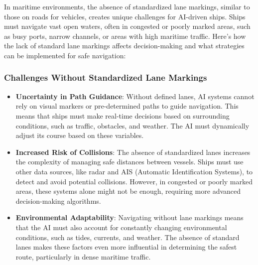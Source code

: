 \documentclass{article}
\begin{document}
In maritime environments, the absence of standardized lane markings, similar to those on roads for vehicles, creates unique challenges for AI-driven ships. Ships must navigate vast open waters, often in congested or poorly marked areas, such as busy ports, narrow channels, or areas with high maritime traffic. Here's how the lack of standard lane markings affects decision-making and what strategies can be implemented for safe navigation:

\subsubsection{\large Challenges Without Standardized Lane Markings}
\begin{itemize}
    \item \textbf{Uncertainty in Path Guidance}: Without defined lanes, AI systems cannot rely on visual markers or pre-determined paths to guide navigation. This means that ships must make real-time decisions based on surrounding conditions, such as traffic, obstacles, and weather. The AI must dynamically adjust its course based on these variables.
    \item \textbf{Increased Risk of Collisions}: The absence of standardized lanes increases the complexity of managing safe distances between vessels. Ships must use other data sources, like radar and AIS (Automatic Identification Systems), to detect and avoid potential collisions. However, in congested or poorly marked areas, these systems alone might not be enough, requiring more advanced decision-making algorithms.
    \item \textbf{Environmental Adaptability}: Navigating without lane markings means that the AI must also account for constantly changing environmental conditions, such as tides, currents, and weather. The absence of standard lanes makes these factors even more influential in determining the safest route, particularly in dense maritime traffic.
\end{itemize}
\end{document}
